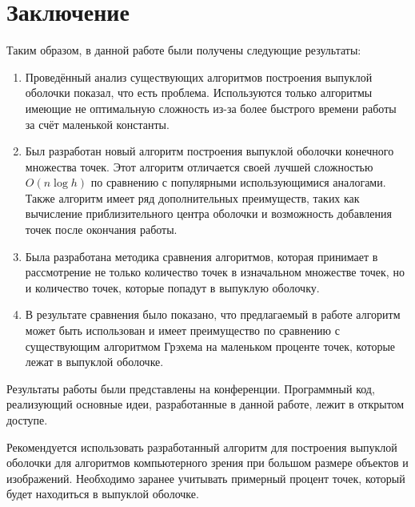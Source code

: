 \chapter*{Заключение}						%


Таким образом, в данной работе были получены следующие результаты:
\begin{enumerate}
	\item Проведённый анализ существующих алгоритмов построения выпуклой оболочки показал, что есть проблема. Используются только алгоритмы имеющие не оптимальную сложность из-за более быстрого времени работы за счёт маленькой константы.
	\item Был разработан новый алгоритм построения выпуклой оболочки конечного множества точек. Этот алгоритм отличается своей лучшей сложностью $O(n \log h)$ по сравнению с популярными использующимися аналогами. Также алгоритм имеет ряд дополнительных преимуществ, таких как вычисление приблизительного центра оболочки и возможность добавления точек после окончания работы.
	\item Была разработана методика сравнения алгоритмов, которая принимает в рассмотрение не только количество точек в изначальном множестве точек, но и количество точек, которые попадут в выпуклую оболочку.
	\item В результате сравнения было показано, что предлагаемый в работе алгоритм может быть использован и имеет преимущество по сравнению с существующим алгоритмом Грэхема на маленьком проценте точек, которые лежат в выпуклой оболочке.
\end{enumerate}

Результаты работы были представлены на конференции\cite{matrokhin2018convex}. Программный код, реализующий основные идеи, разработанные в данной работе, лежит в открытом доступе\cite{matrokhin2017github}.

Рекомендуется использовать разработанный алгоритм для построения выпуклой оболочки для алгоритмов компьютерного зрения при большом размере объектов и изображений. Необходимо заранее учитывать примерный процент точек, который будет находиться в выпуклой оболочке.

